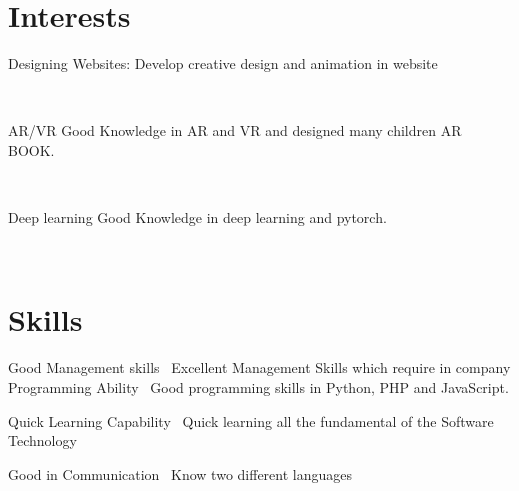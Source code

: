\documentclass[]{cv-style}          %
\begin{document}

\section{Interests}
  \vspace{-0.3cm}
\begin{entrylist}
\entry
{}
{ Designing Websites:}
{}
{Develop creative design and animation in website}

\end{entrylist}\
\begin{entrylist}
\entry
{}
{AR/VR}
{}
{Good Knowledge in AR and VR and designed many children AR BOOK.}
\end{entrylist}\
\begin{entrylist}
\entry
{}
{Deep learning}
{}
{Good Knowledge in deep learning and pytorch.
}

\end{entrylist}\

\section{Skills}
  \vspace{-0.2cm}

\begin{entrylist}
\entry
  {}
  {Good Management skills}
  {}
  {\jobtitle{}\  Excellent Management Skills which require in company}
\entry
  {}
  {Programming Ability }
  {}
  {\jobtitle{}\  Good programming skills in Python, PHP and JavaScript.}
  
  \entry
  {}
  { Quick Learning Capability}
  {}
  {\jobtitle{}\ Quick learning all the fundamental of the Software Technology    }
  
  \entry
  {}
  {Good in Communication }
  {}
  {\jobtitle{}\  Know two different languages }
  

\end{entrylist}
\end{document}
